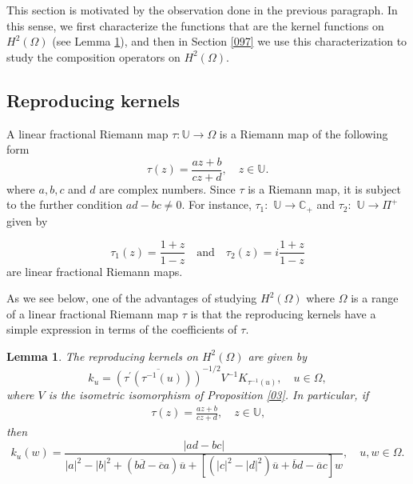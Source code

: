 \documentclass[11pt]{amsart}%
\newtheorem{lem}[thm]{Lemma}
\theoremstyle{definition}
\theoremstyle{remark}
\numberwithin{equation}{section}
\begin{document}
This section is motivated by the observation done in the previous paragraph.
In this sense, we first characterize the functions that are the kernel
functions on $H^{2}(\Omega)$ (see Lemma \ref{024}), and then in Section
\ref{097} we use this characterization to study the composition operators on $H^2(\Omega).$

\subsection{Reproducing kernels}

A linear fractional Riemann map $\tau:\mathbb{U}\longrightarrow\Omega$ is a
Riemann map of the following form
\[
\tau(z)=\frac{az+b}{cz+d},\quad z\in\mathbb{U}.
\]
where $a,b,c$ and $d$ are complex numbers. Since $\tau$ is a Riemann map, it
is subject to the further condition $ad-bc\neq0.$ For instance, $\tau_{1}:$
$\mathbb{U}\rightarrow\mathbb{C}_{+} $ and $\tau_{2}:$ $\mathbb{U}%
\rightarrow\Pi^{+}$ given by%

\[
\tau_{1}(z)=\frac{1+z}{1-z}\quad\text{and}\quad\tau_{2}(z)=i\frac{1+z}{ 1-z}%
\]
are linear fractional Riemann maps.



As we see below, one of the advantages of studying $H^{2}(\Omega)$ where
$\Omega$ is a range of a linear fractional Riemann map $\tau$ is that the
reproducing kernels have a simple expression in terms of the coefficients of
$\tau.$

\begin{lem}
\label{024}
The reproducing kernels on $H^{2}(\Omega)$ are given by
\[
k_{u}=\overline{(\tau^{\prime}(\tau^{-1}(u)))}^{-1/2}V^{-1}%
K_{\tau^{-1}(u)},\quad u\in\Omega,
\]
where $V$ is the isometric isomorphism of Proposition \ref{03}. In particular,
if
\begin{align}\label{022}
\tau(z)=\frac{az+b}{cz+d},\quad z\in\mathbb{U}\text{,}%
\end{align}
then
\[
k_{u}(w)=\frac{|ad-bc|}{|a|^{2}-|b|^{2}+(b\overline{d}-\overline{c}%
a)\overline{u}+[(|c|^{2}-|d|^{2})\overline{u}+\overline{b}d-\overline{a}%
c]w},\quad u,w\in\Omega.
\]

\end{lem}
\end{document}
